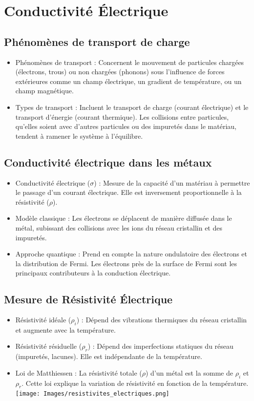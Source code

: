 \documentclass{article}
\begin{document}
\section{Conductivité Électrique}
    \subsection{Phénomènes de transport de charge}
    \begin{itemize}
        \item Phénomènes de transport : Concernent le mouvement de particules chargées (électrons, trous) ou non chargées (phonons) sous l'influence de forces extérieures comme un champ électrique, un gradient de température, ou un champ magnétique.
        \item Types de transport : Incluent le transport de charge (courant électrique) et le transport d'énergie (courant thermique). Les collisions entre particules, qu'elles soient avec d'autres particules ou des impuretés dans le matériau, tendent à ramener le système à l'équilibre.
    \end{itemize}

    \subsection{Conductivité électrique dans les métaux}
    \begin{itemize}
        \item Conductivité électrique ($\sigma$) : Mesure de la capacité d'un matériau à permettre le passage d'un courant électrique. Elle est inversement proportionnelle à la résistivité ($\rho$).
        \item Modèle classique : Les électrons se déplacent de manière diffusée dans le métal, subissant des collisions avec les ions du réseau cristallin et des impuretés.
        \item Approche quantique : Prend en compte la nature ondulatoire des électrons et la distribution de Fermi. Les électrons près de la surface de Fermi sont les principaux contributeurs à la conduction électrique.
    \end{itemize}

    \subsection{Mesure de Résistivité Électrique}
    \begin{itemize}
        \item Résistivité idéale ($\rho_i$) : Dépend des vibrations thermiques du réseau cristallin et augmente avec la température.
        \item Résistivité résiduelle ($\rho_r$) : Dépend des imperfections statiques du réseau (impuretés, lacunes). Elle est indépendante de la température.
        \item Loi de Matthiessen : La résistivité totale ($\rho$) d'un métal est la somme de $\rho_i$ et $\rho_r$. Cette loi explique la variation de résistivité en fonction de la température.
            \texttt{[image: Images/resistivites\_electriques.png]}
    \end{itemize}
\end{document}
